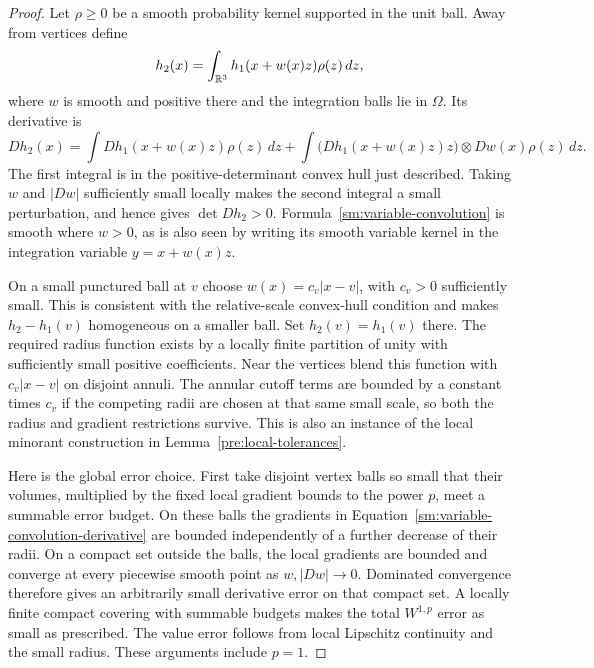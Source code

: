 \begin{proof}
Let $\rho\ge0$ be a smooth probability kernel supported in the
unit ball.  Away from vertices define
\begin{equation}
 \label{sm:variable-convolution}
 h_2(x)=\int_{\mathbb R^3}h_1(x+w(x)z)\rho(z)\,dz,
\end{equation}
where $w$ is smooth and positive there and the integration balls
lie in $\Omega$.  Its derivative is
\begin{equation}
 \label{sm:variable-convolution-derivative}
 Dh_2(x)=\int Dh_1(x+w(x)z)\rho(z)\,dz
 +\int \bigl(Dh_1(x+w(x)z)z\bigr)\otimes Dw(x)\rho(z)\,dz.
\end{equation}
The first integral is in the positive-determinant convex hull just
described.  Taking $w$ and $|Dw|$ sufficiently small locally makes
the second integral a small perturbation, and hence gives
$\det Dh_2>0$.  Formula~\eqref{sm:variable-convolution} is smooth
where $w>0$, as is also seen by writing its smooth variable kernel
in the integration variable $y=x+w(x)z$.

On a small punctured ball at $v$ choose
$w(x)=c_v|x-v|$, with $c_v>0$ sufficiently small.  This is
consistent with the relative-scale convex-hull condition and
makes $h_2-h_1(v)$ homogeneous on a smaller ball.  Set
$h_2(v)=h_1(v)$ there.  The required radius function exists by
a locally finite partition of unity with sufficiently small
positive coefficients.  Near the vertices blend this function
with $c_v|x-v|$ on disjoint annuli.  The annular cutoff terms
are bounded by a constant times $c_v$ if the competing radii
are chosen at that same small scale, so both the radius and
gradient restrictions survive.  This is also an instance of
the local minorant construction in Lemma~\ref{pre:local-tolerances}.

Here is the global error choice.  First take disjoint vertex balls
so small that their volumes, multiplied by the fixed local
gradient bounds to the power $p$, meet a summable error budget.
On these balls the gradients in
Equation~\eqref{sm:variable-convolution-derivative} are bounded independently
of a further decrease of their radii.  On a compact set outside
the balls, the local gradients are bounded and converge at every
piecewise smooth point as $w,|Dw|\to0$.  Dominated convergence
therefore gives an arbitrarily small derivative error on that
compact set.  A locally finite compact covering with summable
budgets makes the total $W^{1,p}$ error as small as prescribed.
The value error follows from local Lipschitz continuity and the
small radius.  These arguments include $p=1$.


\end{proof}

